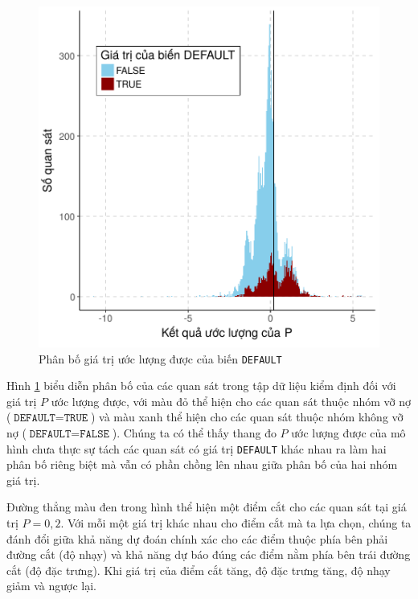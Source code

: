 \documentclass[a4paper]{report}\usepackage[]{graphicx}\usepackage[]{color}
\newenvironment{knitrout}{}{} %
\begin{document}
\begin{figure}[h]
\centering
\capstart
\begin{knitrout}\small
{}\color{fgcolor}
\includegraphics[width=12cm]{Figures/lasso_dist-1} 

\end{knitrout}

\caption{Phân bố giá trị ước lượng được của biến \texttt{DEFAULT}}
\label{fig:lasso_dist}
\end{figure}

Hình \ref{fig:lasso_dist} biểu diễn phân bố của các quan sát trong tập dữ liệu kiểm định đối với giá trị $P$ ước lượng được, với màu đỏ thể hiện cho các quan sát thuộc nhóm vỡ nợ ($\texttt{DEFAULT} = \texttt{TRUE}$) và màu xanh thể hiện cho các quan sát thuộc nhóm không vỡ nợ ($\texttt{DEFAULT} = \texttt{FALSE}$). Chúng ta có thể thấy thang đo $P$ ước lượng được của mô hình chưa thực sự tách các quan sát có giá trị \texttt{DEFAULT} khác nhau ra làm hai phân bố riêng biệt mà vẫn có phần chồng lên nhau giữa phân bố của hai nhóm giá trị. 

Đường thẳng màu đen trong hình thể hiện một điểm cắt cho các quan sát tại giá trị $P = 0,2$. Với mỗi một giá trị khác nhau cho điểm cắt mà ta lựa chọn, chúng ta đánh đổi giữa khả năng dự đoán chính xác cho các điểm thuộc phía bên phải đường cắt (độ nhạy) và khả năng dự báo đúng các điểm nằm phía bên trái đường cắt (độ đặc trưng). Khi giá trị của điểm cắt tăng, độ đặc trưng tăng, độ nhạy giảm và ngược lại.
\end{document}
